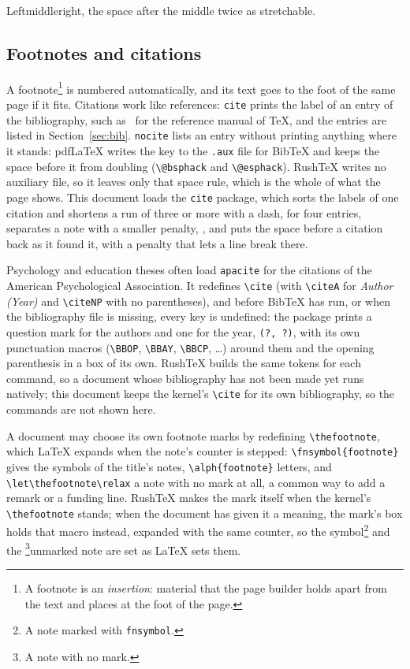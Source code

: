 \documentclass{article}
\numberwithin{equation}{section}
\theoremstyle{definition}
\theoremstyle{remark}
\begin{document}
\noindent Leftmiddleright, the space after the
middle twice as stretchable.

\subsection{Footnotes and citations}

A footnote\footnote{A footnote is an \emph{insertion}: material that the page builder
holds apart from the text and places at the foot of the page.} is numbered
automatically, and its text goes to the foot of the same page if it fits. Citations
work like references: \texttt{cite} prints the label of an entry of the bibliography,
such as~\cite{knuth86} for the reference manual of \TeX, and the entries are listed in
Section~\ref{sec:bib}. \texttt{nocite} lists an entry without printing anything where
it stands:\nocite{knuth86} pdfLaTeX writes the key to the \texttt{.aux} file for BibTeX and
keeps the space before it from doubling (\texttt{\textbackslash @bsphack} and
\texttt{\textbackslash @esphack}). RushTeX writes no auxiliary file, so it leaves only that
space rule, which is the whole of what the page shows. This document loads the
\texttt{cite} package, which sorts the labels of one citation and shortens a run of
three or more with a dash, \cite{liang83,knuth86b,knuth81,knuth86} for four entries,
separates a note with a smaller penalty, \cite[ch.~8]{knuth86}, and puts the space
before a citation back as it found it, with a penalty that lets a line break there.

Psychology and education theses often load \texttt{apacite} for the citations of the
American Psychological Association. It redefines \verb|\cite| (with \verb|\citeA| for
\emph{Author (Year)} and \verb|\citeNP| with no parentheses), and before BibTeX has
run, or when the bibliography file is missing, every key is undefined: the package prints
a question mark for the authors and one for the year, \verb|(?, ?)|, with its own
punctuation macros (\verb|\BBOP|, \verb|\BBAY|, \verb|\BBCP|, \dots) around them and
the opening parenthesis in a box of its own. RushTeX builds the same tokens for each
command, so a document whose bibliography has not been made yet runs natively; this
document keeps the kernel's \verb|\cite| for its own bibliography, so the commands are
not shown here.

A document may choose its own footnote marks by redefining \verb|\thefootnote|, which
\LaTeX{} expands when the note's counter is stepped: \verb|\fnsymbol{footnote}| gives
the symbols of the title's notes, \verb|\alph{footnote}| letters, and
\verb|\let\thefootnote\relax| a note with no mark at all, a common way to add a remark
or a funding line. RushTeX makes the mark itself when the kernel's
\verb|\thefootnote| stands; when the document has given it a meaning, the mark's box
holds that macro instead, expanded with the same counter, so the
{\renewcommand{\thefootnote}{\fnsymbol{footnote}}symbol\footnote{A note marked with
\texttt{fnsymbol}.}} and the {\let\thefootnote\relax\footnote{A note with no
mark.}}unmarked note are set as \LaTeX{} sets them.
\end{document}
